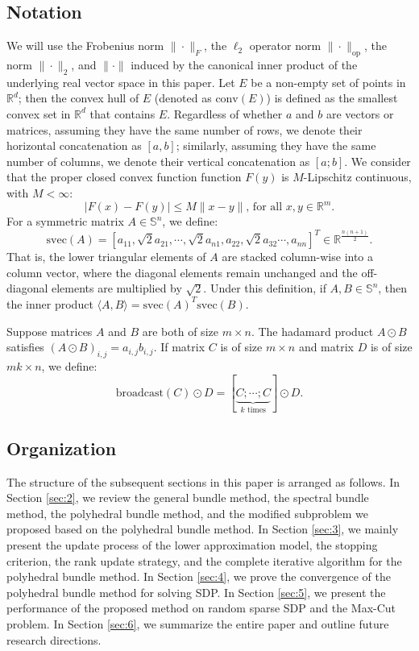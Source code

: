 \documentclass{jcmlatex}
\begin{document}
\subsection{Notation}
We will use the Frobenius norm \(\|\cdot\|_F\), the \(\ell_2\) operator norm \(\|\cdot\|_{\text{op}}\), the norm \(\|\cdot\|_2\), and \(\|\cdot\|\) induced by the canonical inner product of the underlying real vector space in this paper. Let \( E \) be a non-empty set of points in \( \mathbb{R}^d \); then the convex hull of \( E \) (denoted as \( \text{conv}(E) \)) is defined as the smallest convex set in \( \mathbb{R}^d \) that contains \( E \). Regardless of whether \(a\) and \(b\) are vectors or matrices, assuming they have the same number of rows, we denote their horizontal concatenation as \([a, b]\); similarly, assuming they have the same number of columns, we denote their vertical concatenation as \([a; b]\). We consider that the proper closed convex function function \(F(y)\) is \(M\)-Lipschitz continuous, with \(M<\infty\):
\begin{equation*}
|F(x)-F(y)| \leq M\| x -y\| \text{, for all }x,y \in \mathbb{R}^{m}. 
\end{equation*}
For a symmetric matrix \(A \in \mathbb{S}^{n}\), we define:  
\begin{equation*}
\text{svec}(A) = \left[ a_{11}, \sqrt{2}a_{21}, \cdots, \sqrt{2}a_{n1}, a_{22}, \sqrt{2}a_{32}\cdots, a_{nn} \right]^{T} \in \mathbb{R}^{\frac{n(n+1)}{2}}.
\end{equation*}
That is, the lower triangular elements of \(A\) are stacked column-wise into a column vector, where the diagonal elements remain unchanged and the off-diagonal elements are multiplied by \(\sqrt{2}\). Under this definition, if \(A, B \in \mathbb{S}^{n}\), then the inner product \(\langle A, B \rangle = \text{svec}(A)^{T} \text{svec}(B)\).

Suppose matrices \(A\) and \(B\) are both of size \(m \times n\). The hadamard product \(A \odot B\) satisfies \((A \odot B)_{i,j} = a_{i,j}b_{i,j}\). If matrix \(C\) is of size \(m \times n\) and matrix \(D\) is of size \(mk \times n\), we define:  
\[
\text{broadcast}(C) \odot D = \left[ \underbrace{C;\cdots;C}_{k \text{ times}} \right] \odot D.
\]
\subsection{Organization}
The structure of the subsequent sections in this paper is arranged as follows. In Section \ref{sec:2}, we review the general bundle method, the spectral bundle method, the polyhedral bundle method, and the modified subproblem we proposed based on the polyhedral bundle method. In Section \ref{sec:3}, we mainly present the update process of the lower approximation model, the stopping criterion, the rank update strategy, and the complete iterative algorithm for the polyhedral bundle method. In Section \ref{sec:4}, we prove the convergence of the polyhedral bundle method for solving SDP. In Section \ref{sec:5}, we present the performance of the proposed method on random sparse SDP and the Max-Cut problem. In Section \ref{sec:6}, we summarize the entire paper and outline future research directions.
\end{document}
